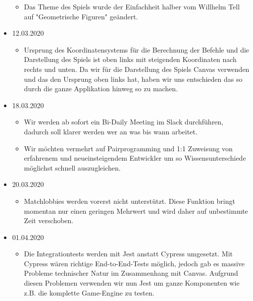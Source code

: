 \documentclass[11pt,a4paper]{scrartcl}
\begin{document}
\begin{itemize}
        \begin{itemize}
          \item Das Theme des Spiels wurde der Einfachheit halber vom Willhelm Tell auf "Geometrische Figuren" geändert.
        \end{itemize}
  \item 12.03.2020
        \begin{itemize}
          \item Ursprung des Koordinatensystems für die Berechnung der Befehle und die Darstellung des Spiels ist oben links
                mit steigenden Koordinaten nach rechts und unten. Da wir für die Darstellung des Spiels Canvas verwenden und das den
                Ursprung oben links hat, haben wir uns entschieden das so durch die ganze Applikation hinweg so zu machen.
        \end{itemize}
  \item 18.03.2020
        \begin{itemize}
          \item Wir werden ab sofort ein Bi-Daily Meeting im Slack durchführen, dadurch soll klarer werden wer an was bis wann arbeitet.
          \item Wir möchten vermehrt auf Pairprogramming und 1:1 Zuweisung von erfahrenem und neueinsteigendem Entwickler um so
                Wissensunterschiede möglichst schnell auszugleichen.
        \end{itemize}
  \item 20.03.2020
        \begin{itemize}
          \item Matchlobbies werden vorerst nicht unterstützt. Diese Funktion bringt momentan nur einen geringen Mehrwert und wird daher auf unbestimmte
                Zeit verschoben.
        \end{itemize}
  \item 01.04.2020
        \begin{itemize}
          \item Die Integrationtests werden mit Jest anstatt Cypress umgesetzt. Mit Cypress wären richtige End-to-End-Tests möglich, jedoch gab es massive Probleme technischer Natur im Zusammenhang mit Canvas. 
                Aufgrund diesen Problemen verwenden wir nun Jest um ganze Komponenten wie z.B. die komplette Game-Engine zu testen.
        \end{itemize}
\end{itemize}

\clearpage
\end{document}
